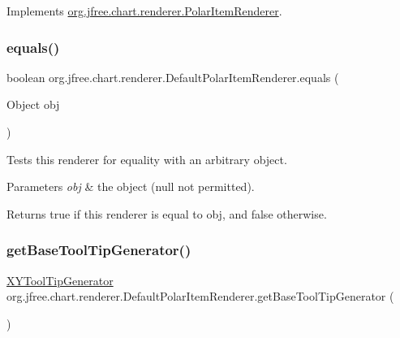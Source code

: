 Implements \mbox{\hyperlink{interfaceorg_1_1jfree_1_1chart_1_1renderer_1_1_polar_item_renderer_ae3e3008460884a712496a363d9103bc8}{org.\+jfree.\+chart.\+renderer.\+Polar\+Item\+Renderer}}.

\mbox{\label{classorg_1_1jfree_1_1chart_1_1renderer_1_1_default_polar_item_renderer_aba0dfda73b8ccd5602de7a4e0ba1aa07}} 
\subsubsection{\texorpdfstring{equals()}{equals()}}
{\footnotesize\ttfamily boolean org.\+jfree.\+chart.\+renderer.\+Default\+Polar\+Item\+Renderer.\+equals (\begin{DoxyParamCaption}\item[{Object}]{obj }\end{DoxyParamCaption})}

Tests this renderer for equality with an arbitrary object.


\begin{DoxyParams}{Parameters}
{\em obj} & the object ({\ttfamily null} not permitted).\\
\hline
\end{DoxyParams}
\begin{DoxyReturn}{Returns}
{\ttfamily true} if this renderer is equal to {\ttfamily obj}, and {\ttfamily false} otherwise. 
\end{DoxyReturn}
\mbox{\label{classorg_1_1jfree_1_1chart_1_1renderer_1_1_default_polar_item_renderer_a79cb58010b42feef92a7def54ad727ba}} 
\subsubsection{\texorpdfstring{get\+Base\+Tool\+Tip\+Generator()}{getBaseToolTipGenerator()}}
{\footnotesize\ttfamily \mbox{\hyperlink{interfaceorg_1_1jfree_1_1chart_1_1labels_1_1_x_y_tool_tip_generator}{X\+Y\+Tool\+Tip\+Generator}} org.\+jfree.\+chart.\+renderer.\+Default\+Polar\+Item\+Renderer.\+get\+Base\+Tool\+Tip\+Generator (\begin{DoxyParamCaption}{ }\end{DoxyParamCaption})}

